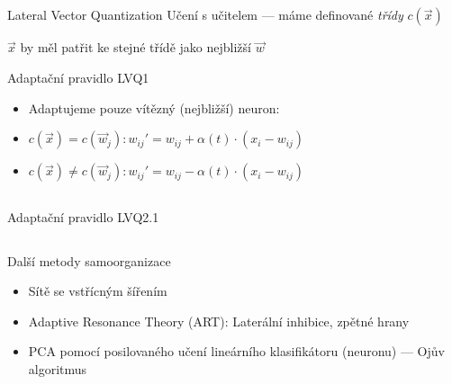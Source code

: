 \documentclass{beamer}
\begin{document}
\subsection{}
\begin{frame}{Lateral Vector Quantization}
Učení s učitelem --- máme definované {\em třídy} $c(\vec x)$

$\vec x$ by měl patřit ke stejné třídě jako nejbližší $\vec w$

\begin{block}{Adaptační pravidlo LVQ1}
\begin{itemize}
\item Adaptujeme pouze vítězný (nejbližší) neuron:
\item $c(\vec x) = c(\vec w_j)\colon w_{ij}' = w_{ij} + \alpha(t) \cdot (x_i - w_{ij})$
\item $c(\vec x) \ne c(\vec w_j)\colon w_{ij}' = w_{ij} - \alpha(t) \cdot (x_i - w_{ij})$
\end{itemize}
\end{block}
\end{frame}

\subsection{}
\begin{frame}{Adaptační pravidlo LVQ2.1}
\end{frame}

\subsection{}
\begin{frame}{Další metody samoorganizace}
\begin{itemize}
\item Sítě se vstřícným šířením
\item Adaptive Resonance Theory (ART): Laterální inhibice, zpětné hrany
\item PCA pomocí posilovaného učení lineárního klasifikátoru (neuronu) --- Ojův algoritmus
\end{itemize}
\end{frame}
\end{document}
